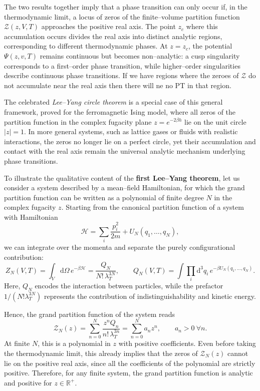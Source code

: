 The two results together imply that a phase transition can only occur if, in the thermodynamic limit, a locus of zeros of the finite--volume partition function \(\mathcal{Z}(z,V,T)\) approaches the positive real axis.
The point \(z_c\) where this accumulation occurs divides the real axis into distinct analytic regions, corresponding to different thermodynamic phases.
At \(z = z_c\), the potential \( \Psi(z,v,T) \) remains continuous but becomes non--analytic:
a cusp singularity corresponds to a first--order phase transition, while higher--order singularities describe continuous phase transitions.
If we have regions where the zeroes of \(\mathcal{Z}\) do not accumulate near the real axis then there will ne no PT in that region.

\begin{remark}
    The celebrated \textit{Lee--Yang circle theorem} is a special case of this general framework, proved for the ferromagnetic Ising model, where all zeros of the partition function in the complex fugacity plane \( z = e^{-2\beta h} \) lie on the unit circle \( |z| = 1 \).
    In more general systems, such as lattice gases or fluids with realistic interactions, the zeros no longer lie on a perfect circle, yet their accumulation and contact with the real axis remain the universal analytic mechanism underlying phase transitions.
\end{remark}

To illustrate the qualitative content of the \textbf{first Lee--Yang theorem}, let us consider a system described by a mean--field Hamiltonian, for which the grand partition function can be written as a polynomial of finite degree \( N \) in the complex fugacity \( z \). Starting from the canonical partition function of a system with Hamiltonian
\[
    \mathcal{H} = \sum_i \frac{p_i^2}{2m} + U_N(q_1, \dots, q_N),
\]
we can integrate over the momenta and separate the purely configurational contribution:
\[
    Z_N(V,T) = \int_V \! \mathrm{d}\Omega \, e^{-\beta \mathcal{H}}
    = \frac{Q_N}{N!\,\lambda_{T}^{3N}},
    \qquad
    Q_N(V,T) = \int \prod_i \mathrm{d}^3q_i \, e^{-\beta U_N(q_1,\dots,q_N)}.
\]
Here, \( Q_N \) encodes the interaction between particles, while the prefactor
\( 1/(N!\lambda_{T}^{3N}) \) represents the contribution of indistinguishability and kinetic energy.

Hence, the grand partition function of the system reads
\[
    \mathcal{Z}_N(z)
    = \sum_{n=0}^N \frac{z^n Q_n}{n!\,\lambda_{T}^{3n}}
    = \sum_{n=0}^N a_n z^n,
    \qquad a_n > 0 \ \forall n.
\]
At finite \( N \), this is a polynomial in \( z \) with positive coefficients.
Even before taking the thermodynamic limit, this already implies that the zeros of
\( \mathcal{Z}_N(z) \) cannot lie on the positive real axis, since all the coefficients
of the polynomial are strictly positive. Therefore, for any finite system, the grand
partition function is analytic and positive for \( z \in \mathbb{R}^+ \).

